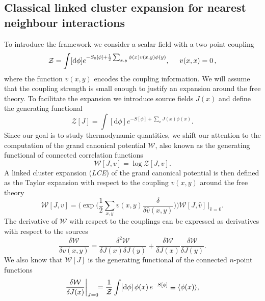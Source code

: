 \subsection{Classical linked cluster expansion for nearest neighbour interactions}
\label{sec:classical_lce_nn}

To introduce the framework we consider a scalar field with a two-point coupling
%
\begin{equation} \label{eq:scalar_field_Z}
  \mathcal{Z} = \int [\mathrm{d} \phi] e^{-S_0[\phi] + \frac{1}{2}
    \sum_{x,y}
    \phi(x) v(x,y) \phi(y)}, \hskip .5cm v(x,x) = 0 \,,
\end{equation}
%
where the function $v(x,y)$ encodes the coupling information. We will assume that the
coupling strength is small enough to justify an expansion around the free
theory. To facilitate the expansion we introduce source fields $J(x)$ and define
the generating functional
%
\begin{equation}
  \mathcal{Z}[J] = \int [\mathrm{d} \phi] e^{-S[\phi] + \sum_x J(x) \phi(x)}.
\end{equation}
%
Since our goal is to study thermodynamic quantities, we shift our attention to
the computation of the grand canonical potential $\mathcal{W}$, also known as
the generating functional of connected correlation functions
%
\begin{equation}
  \mathcal{W}[J,v] = \log \mathcal{Z}[J,v].
\end{equation}
%
A linked cluster expansion (\emph{LCE}) of the grand canonical potential is then defined as
the Taylor expansion with respect to the coupling $v(x,y)$ around the free
theory
%
\begin{equation} \label{eq:cluster_expansion_def}
  \mathcal{W}[J,v] = \bigg( \exp \bigg(\frac{1}{2} \sum_{x,y} v(x,y)
    \frac{\delta}{\delta \hat{v}(x,y)} \bigg) \bigg) \mathcal{W}[J,\hat{v}]
    \,\Bigg|_{\hat{v}=0}.
\end{equation}
%
The derivative of $\mathcal{W}$ with respect to the couplings can be expressed
as derivatives with respect to the sources
%
\begin{equation}
  \frac{\delta \mathcal{W}}{\delta v(x,y)} = \frac{\delta^2 \mathcal{W}}{\delta
    J(x) \delta J(y)} + \frac{\delta \mathcal{W}}{\delta J(x)} \frac{\delta \mathcal{W}}{\delta J(y)}.
\end{equation}
%
We also know that $\mathcal{W}[J]$ is the generating functional of the
connected $n$-point functions 
%
\begin{equation}
  \frac{\delta \mathcal{W}}{\delta J(x)} \bigg|_{J=\mathrlap{0}} 
    = \frac{1}{\mathcal{Z}} \int [\mathrm{d} \phi] \, \phi(x) \, e^{-S[\phi]}
    \equiv \langle \phi(x) \rangle,
\end{equation}

